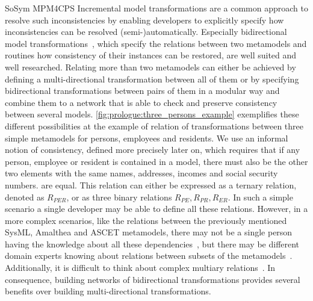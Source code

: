 \begin{copiedFrom}{SoSym MPM4CPS}
Incremental model transformations are a common approach to resolve such inconsistencies by enabling developers to explicitly specify how inconsistencies can be resolved (semi-)automatically. 
Especially bidirectional model transformations~\cite{stevens2010sosym}, which specify the relations between two metamodels and routines how consistency of their instances can be restored, are well suited and well researched.
Relating more than two metamodels can either be achieved by defining a multi-directional transformation between all of them or by specifying bidirectional transformations %
between pairs of them in a modular way and combine them to a network that is able to check and preserve consistency between several models.
\autoref{fig:prologue:three_persons_example} exemplifies these different possibilities at the example of relation of transformations between three simple metamodels for persons, employees and residents.
We use an informal notion of consistency, defined more precisely later on, which requires that if any person, employee or resident is contained in a model, there must also be the other two elements with the same names, addresses, incomes and social security numbers. %
are equal.
This relation can either be expressed as a ternary relation, denoted as $R_{PER}$, or as three binary relations $R_{PE}, R_{PR}, R_{ER}$.
In such a simple scenario a single developer may be able to define all these relations.
However, in a more complex scenarios, like the relations between the previously mentioned SysML, Amalthea and ASCET metamodels, there may not be a single person having the knowledge about all these dependencies~\cite{petrenko2008a}, but there may be different domain experts knowing about relations between subsets of the metamodels~\cite{klare2018docsym}.
Additionally, it is difficult to think about complex multiary relations~\cite{stevens2017a}.
In consequence, building networks of bidirectional transformations provides several benefits over building multi-directional transformations.


\end{copiedFrom}
